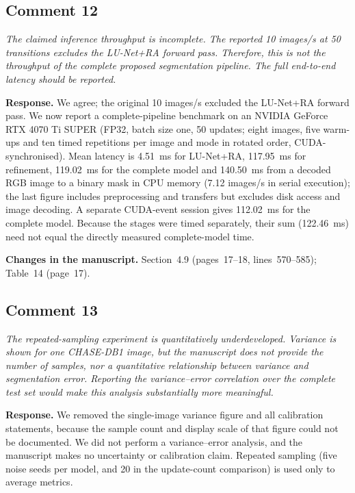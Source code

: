 \documentclass[11pt,a4paper]{article}
\newenvironment{revcomment}{\par\medskip\noindent\begin{minipage}{\linewidth}\itshape}{\end{minipage}\par\smallskip}
\begin{document}
\subsection*{Comment 12}
\begin{revcomment}The claimed inference throughput is incomplete. The reported 10 images/s at 50 transitions excludes the LU-Net+RA forward pass. Therefore, this is not the throughput of the complete proposed segmentation pipeline. The full end-to-end latency should be reported.\end{revcomment}
\textbf{Response.} We agree; the original 10 images/s excluded the LU-Net+RA forward pass. We now report a complete-pipeline benchmark on an NVIDIA GeForce RTX 4070 Ti SUPER (FP32, batch size one, 50 updates; eight images, five warm-ups and ten timed repetitions per image and mode in rotated order, CUDA-synchronised). Mean latency is 4.51~ms for LU-Net+RA, 117.95~ms for refinement, 119.02~ms for the complete model and 140.50~ms from a decoded RGB image to a binary mask in CPU memory (7.12 images/s in serial execution); the last figure includes preprocessing and transfers but excludes disk access and image decoding. A separate CUDA-event session gives 112.02~ms for the complete model. Because the stages were timed separately, their sum (122.46~ms) need not equal the directly measured complete-model time.

\textbf{Changes in the manuscript.} Section~4.9 (pages~17--18, lines~570--585); Table~14 (page~17).

\subsection*{Comment 13}
\begin{revcomment}The repeated-sampling experiment is quantitatively underdeveloped. Variance is shown for one CHASE-DB1 image, but the manuscript does not provide the number of samples, nor a quantitative relationship between variance and segmentation error. Reporting the variance--error correlation over the complete test set would make this analysis substantially more meaningful.\end{revcomment}
\textbf{Response.} We removed the single-image variance figure and all calibration statements, because the sample count and display scale of that figure could not be documented. We did not perform a variance--error analysis, and the manuscript makes no uncertainty or calibration claim. Repeated sampling (five noise seeds per model, and 20 in the update-count comparison) is used only to average metrics.
\end{document}
